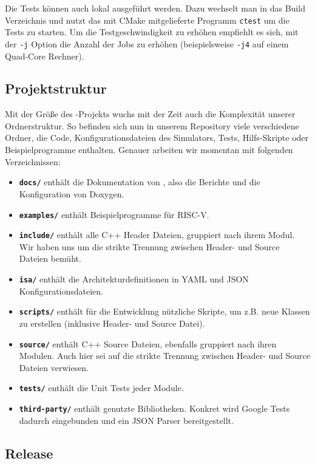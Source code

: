 Die Tests können auch lokal ausgeführt werden. Dazu wechselt man in das Build
Verzeichnis und nutzt das mit CMake mitgelieferte Programm \texttt{ctest} um die
Tests zu starten. Um die Testgeschwindigkeit zu erhöhen empfiehlt es sich, mit
der \texttt{-j} Option die Anzahl der Jobs zu erhöhen (beispielsweise
\texttt{-j4} auf einem Quad-Core Rechner).

\subsection{Projektstruktur}

Mit der Größe des \erasim{}-Projekts wuchs mit der Zeit auch die Komplexität
unserer Ordnerstruktur. So befinden sich nun in unserem Repository viele
verschiedene Ordner, die Code, Konfigurationsdateien des Simulators, Tests,
Hilfs-Skripte oder Beispielprogramme enthalten. Genauer arbeiten wir momentan
mit folgenden Verzeichnissen:

\begin{itemize}
	\item \textbf{\texttt{docs/}} enthält die Dokumentation von \erasim{}, also
	die Berichte und die Konfiguration von Doxygen.
	\item \textbf{\texttt{examples/}} enthält Beispielprogramme für RISC-V.
	\item \textbf{\texttt{include/}} enthält alle C++ Header Dateien, gruppiert
	nach ihrem Modul. Wir haben uns um die strikte Trennung zwischen Header- und
	Source Dateien bemüht.
	\item \textbf{\texttt{isa/}} enthält die Architekturdefinitionen in YAML und
	JSON Konfigurationsdateien.
	\item \textbf{\texttt{scripts/}} enthält für die Entwicklung nützliche
	Skripte, um z.B. neue Klassen zu erstellen (inklusive Header- und
	Source Datei).
	\item \textbf{\texttt{source/}} enthält C++ Source Dateien, ebenfalls
	gruppiert nach ihren Modulen. Auch hier sei auf die strikte Trennung
	zwischen Header- und Source Dateien verwiesen.
	\item \textbf{\texttt{tests/}} enthält die Unit Tests jeder Module.
	\item \textbf{\texttt{third-party/}} enthält genutzte Bibliotheken. Konkret
	wird Google Tests dadurch eingebunden und ein JSON Parser bereitgestellt.
\end{itemize}

\subsection{Release}

